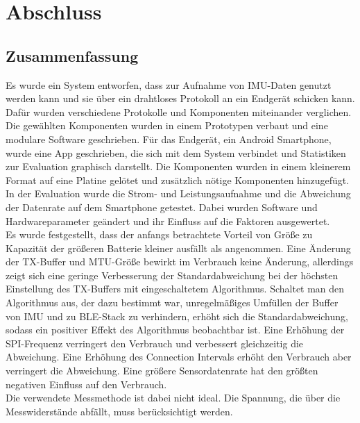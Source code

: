 \chapter{Abschluss}
\label{ch:closure}

\section{Zusammenfassung}
Es wurde ein System entworfen, dass zur Aufnahme von IMU-Daten genutzt werden kann und sie über ein drahtloses Protokoll an ein Endgerät schicken kann.
Dafür wurden verschiedene Protokolle und Komponenten miteinander verglichen.
Die gewählten Komponenten wurden in einem Prototypen verbaut und eine modulare Software geschrieben.
Für das Endgerät, ein Android Smartphone, wurde eine App geschrieben, die sich mit dem System verbindet und Statistiken zur Evaluation graphisch darstellt.
Die Komponenten wurden in einem kleinerem Format auf eine Platine gelötet und zusätzlich nötige Komponenten hinzugefügt.
In der Evaluation wurde die Strom- und Leistungsaufnahme und die Abweichung der Datenrate auf dem Smartphone getestet.
Dabei wurden Software und Hardwareparameter geändert und ihr Einfluss auf die Faktoren ausgewertet.\\
Es wurde festgestellt, dass der anfangs betrachtete Vorteil von Größe zu Kapazität der größeren Batterie kleiner ausfällt als angenommen.
Eine Änderung der TX-Buffer und MTU-Größe bewirkt im Verbrauch keine Änderung, allerdings zeigt sich eine geringe Verbesserung der Standardabweichung bei der höchsten Einstellung des TX-Buffers mit eingeschaltetem Algorithmus.
Schaltet man den Algorithmus aus, der dazu bestimmt war, unregelmäßiges Umfüllen der Buffer von IMU und zu BLE-Stack zu verhindern, erhöht sich die Standardabweichung, sodass ein positiver Effekt des Algorithmus beobachtbar ist.
Eine Erhöhung der SPI-Frequenz verringert den Verbrauch und verbessert gleichzeitig die Abweichung.
Eine Erhöhung des Connection Intervals erhöht den Verbrauch aber verringert die Abweichung.
Eine größere Sensordatenrate hat den größten negativen Einfluss auf den Verbrauch.\\
Die verwendete Messmethode ist dabei nicht ideal.
Die Spannung, die über die Messwiderstände abfällt, muss berücksichtigt werden.
